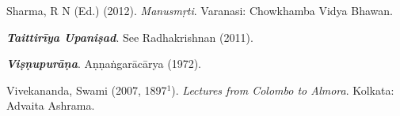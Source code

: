 \begin{thebibliography}{99}
Sharma, R N (Ed.) (2012).  {\sl Manusmṛti}. Varanasi: Chowkhamba Vidya Bhawan.

{{\sl\bfseries Taittirīya Upaniṣad}}. See Radhakrishnan (2011).

{{\sl\bfseries Viṣṇupurāṇa}}. Aṇṇaṅgarācārya (1972).

Vivekananda, Swami (2007, 1897$^1$). {\sl Lectures from Colombo to Almora}. Kolkata: Advaita Ashrama.
\end{thebibliography}


\theendnotes
\label{chapter\thechapter:end}

